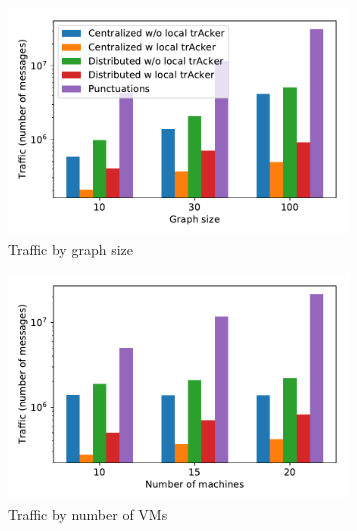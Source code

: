 \begin{figure}[t!]
    \begin{subfigure}[b]{0.3\textwidth}
            \includegraphics[width=0.99\textwidth]{pics/traffic_by_graph_size_bars.pdf}
            \caption{Traffic by graph size}
            \label{traffic_graph}
    \end{subfigure}
    \hspace{5mm}
    \begin{subfigure}[b]{0.3\textwidth}
            \includegraphics[width=0.99\textwidth]{pics/traffic_by_number_of_machines_bars.pdf}
            \caption{Traffic by number of VMs}
            \label{traffic_machines}
    \end{subfigure}
    \hspace{5mm}
    \begin{subfigure}[b]{0.3\textwidth}

\end{subfigure}
\end{figure}
